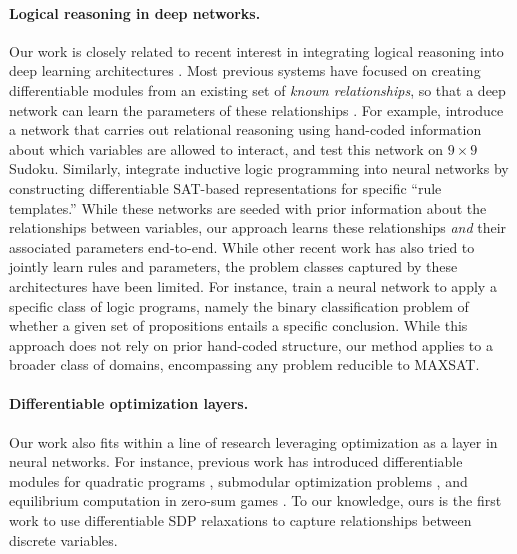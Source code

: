 \documentclass{article}
\begin{document}
	\paragraph{Logical reasoning in deep networks.} Our work is closely related to recent interest in integrating logical reasoning into deep learning architectures \cite{garcez2015neural}. 
	Most previous systems have focused on creating differentiable modules from an existing set of \emph{known relationships}, so that a deep network can learn the parameters of these relationships \cite{dai2018tunneling, manhaeve2018deepproblog, sourek2018lifted,xu2018semantic,hu2016harnessing,yang2017differentiable, selsam2018learning}.
	For example, \citet{palm2017recurrent} introduce a network that carries out relational reasoning using hand-coded information about which variables are allowed to interact, and test this network on $9 \times 9$ Sudoku.
	Similarly, \citet{evans2018learning} integrate inductive logic programming into neural networks by constructing differentiable SAT-based representations for specific ``rule templates.''
	While these networks are seeded with prior information about the relationships between variables, our approach learns these relationships \emph{and} their associated parameters end-to-end.
	While other recent work has also tried to jointly learn rules and parameters, the problem classes captured by these architectures have been limited.
	For instance, \citet{cingillioglu2018deeplogic} train a neural network to apply a specific class of logic programs, namely the binary classification problem of whether a given set of propositions entails a specific conclusion.  
	While this approach does not rely on prior hand-coded structure, our method applies to a broader class of domains, encompassing any problem reducible to MAXSAT. 
	
	\vspace{-5pt}
	\paragraph{Differentiable optimization layers.} Our work also fits within a line of research leveraging optimization as a layer in neural networks. For instance, previous work has introduced differentiable modules for quadratic programs \cite{amos2017optnet,donti2017task}, submodular optimization problems \cite{djolonga2017differentiable,tschiatschek2018differentiable,wilder2018melding}, and equilibrium computation in zero-sum games \cite{ling2018what}. To our knowledge, ours is the first work to use differentiable SDP relaxations to capture relationships between discrete variables.
	
\end{document}
